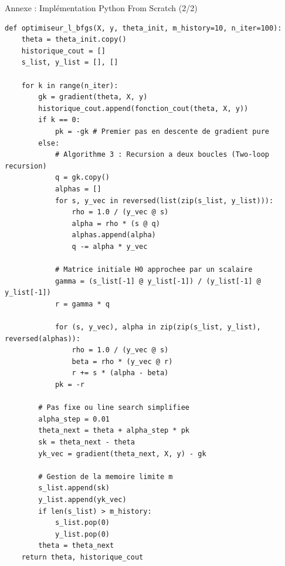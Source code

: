\documentclass{beamer}
\begin{document}
\begin{frame}[fragile]{Annexe : Implémentation Python From Scratch (2/2)}
    \begin{lstlisting}
def optimiseur_l_bfgs(X, y, theta_init, m_history=10, n_iter=100):
    theta = theta_init.copy()
    historique_cout = []
    s_list, y_list = [], []
    
    for k in range(n_iter):
        gk = gradient(theta, X, y)
        historique_cout.append(fonction_cout(theta, X, y))
        if k == 0:
            pk = -gk # Premier pas en descente de gradient pure
        else:
            # Algorithme 3 : Recursion a deux boucles (Two-loop recursion)
            q = gk.copy()
            alphas = []
            for s, y_vec in reversed(list(zip(s_list, y_list))):
                rho = 1.0 / (y_vec @ s)
                alpha = rho * (s @ q)
                alphas.append(alpha)
                q -= alpha * y_vec
            
            # Matrice initiale H0 approchee par un scalaire
            gamma = (s_list[-1] @ y_list[-1]) / (y_list[-1] @ y_list[-1])
            r = gamma * q
            
            for (s, y_vec), alpha in zip(zip(s_list, y_list), reversed(alphas)):
                rho = 1.0 / (y_vec @ s)
                beta = rho * (y_vec @ r)
                r += s * (alpha - beta)
            pk = -r
            
        # Pas fixe ou line search simplifiee
        alpha_step = 0.01
        theta_next = theta + alpha_step * pk
        sk = theta_next - theta
        yk_vec = gradient(theta_next, X, y) - gk
        
        # Gestion de la memoire limite m
        s_list.append(sk)
        y_list.append(yk_vec)
        if len(s_list) > m_history:
            s_list.pop(0)
            y_list.pop(0)
        theta = theta_next
    return theta, historique_cout
    \end{lstlisting}
\end{frame}
\end{document}
